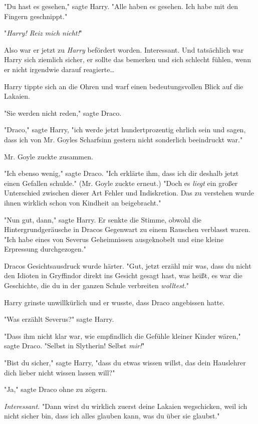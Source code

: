 {"Du hast es gesehen," sagte Harry. "Alle haben es gesehen. Ich habe mit den Fingern geschnippt."

"\emph{Harry! Reiz mich nicht!}"

Also war er jetzt zu \emph{Harry} befördert worden. Interessant. Und tatsächlich war Harry sich ziemlich sicher, er sollte das bemerken und sich schlecht fühlen, wenn er nicht irgendwie darauf reagierte…

Harry tippte sich an die Ohren und warf einen bedeutungsvollen Blick auf die Lakaien.

"Sie werden nicht reden," sagte Draco.

"Draco," sagte Harry, "ich werde jetzt hundertprozentig ehrlich sein und sagen, dass ich von Mr. Goyles Scharfsinn gestern nicht sonderlich beeindruckt war."

Mr. Goyle zuckte zusammen.

"Ich ebenso wenig," sagte Draco. "Ich erklärte ihm, dass ich dir deshalb jetzt einen Gefallen schulde." (Mr. Goyle zuckte erneut.) "Doch es \emph{liegt} ein großer Unterschied zwischen dieser Art Fehler und Indiskretion. Das zu verstehen wurde ihnen wirklich schon von Kindheit an beigebracht."

"Nun gut, dann," sagte Harry. Er senkte die Stimme, obwohl die Hintergrundgeräusche in Dracos Gegenwart zu einem Rauschen verblasst waren. "Ich habe eines von Severus Geheimnissen ausgeknobelt und eine kleine Erpressung durchgezogen."

Dracos Gesichtsausdruck wurde härter. "Gut, jetzt erzähl mir was, dass du nicht den Idioten in Gryffindor direkt ins Gesicht gesagt hast, was heißt, es war die Geschichte, die du in der ganzen Schule verbreiten \emph{wolltest.}"

Harry grinste unwillkürlich und er wusste, dass Draco angebissen hatte.

"Was erzählt Severus?" sagte Harry.

"Dass ihm nicht klar war, wie empfindlich die Gefühle kleiner Kinder wären," sagte Draco. "Selbst in Slytherin! Selbst \emph{mir!}"

"Bist du sicher," sagte Harry, "dass du etwas wissen willst, das dein Hauslehrer dich lieber nicht wissen lassen will?"

"Ja," sagte Draco ohne zu zögern.

\emph{Interessant.} "Dann wirst du wirklich zuerst deine Lakaien wegschicken, weil ich nicht sicher bin, dass ich alles glauben kann, was du über sie glaubst."

}
